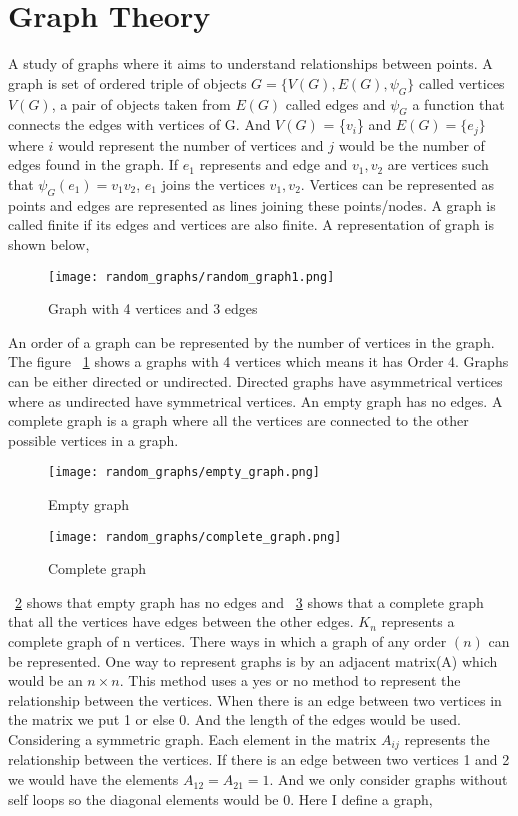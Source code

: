 \documentclass[12pt, a4paper]{Assignment}
\begin{document}
\section{Graph Theory}
A study of graphs where it aims to understand relationships between points. 
A graph is set of ordered triple of objects $G = \{V(G),E(G), \psi_G\}$ called vertices $V(G)$, a pair of objects taken from $E(G)$ called edges and $\psi_G$ a function that connects the edges with vertices of G.
And $V(G)$ = \{$v_i$\} and $E(G)=\{e_j\}$ where $i$ would represent the number of vertices and $j$ would be the number of edges found in the graph.
If $e_1$ represents and edge and $v_1 ,v_2$ are vertices such that $\psi_G(e_1)=v_1v_2$, $e_1$ joins the vertices $v_1,v_2$.\cite{BondyMurty2008} 
Vertices can be represented as points and edges are represented as lines joining these points/nodes.
A graph is called finite if its edges and vertices are also finite.
A representation of graph is shown below,
\begin{figure}[H]
	\centering
	\texttt{[image: random\_graphs/random\_graph1.png]}
	\caption{Graph with 4 vertices and 3 edges}
	\label{random_graph1}
\end{figure}

An order of a graph can be represented by the number of vertices in the graph.
The figure ~\ref{random_graph1} shows a graphs with 4 vertices which means it has Order 4.
Graphs can be either directed or undirected. 
Directed graphs have asymmetrical vertices where as undirected have symmetrical vertices.
An empty graph has no edges.
A complete graph is a graph where all the vertices are connected to the other possible vertices in a graph.\cite{reducible_graph_theory} 
\begin{figure}[H]
	\centering
	\texttt{[image: random\_graphs/empty\_graph.png]}
	\caption{Empty graph}
	\label{empty_graph}
\end{figure}
\begin{figure}[H]
	\centering
	\texttt{[image: random\_graphs/complete\_graph.png]}
	\caption{Complete graph}
	\label{complete_graph}
\end{figure}
~\ref{empty_graph} shows that empty graph has no edges and ~\ref{complete_graph} shows that a complete graph that all the vertices have edges between the other edges.
$K_n$ represents a complete graph of n vertices.
\newline 
There ways in which a graph of any order $(n)$ can be represented.
One way to represent graphs is by an adjacent matrix(A) which would be an $n \times n$.\cite{reducible_graph_theory}
This method uses a yes or no method to represent the relationship between the vertices.
When there is an edge between two vertices in the matrix we put 1 or else 0.
And the length of the edges would be used.
Considering a symmetric graph.
Each element in the matrix $A_{ij}$ represents the relationship between the vertices.
If there is an edge between two vertices 1 and 2 we would have the elements $A_{12} = A_{21}=1$.
And we only consider graphs without self loops so the diagonal elements would be 0.
Here I define a graph,
\end{document}
